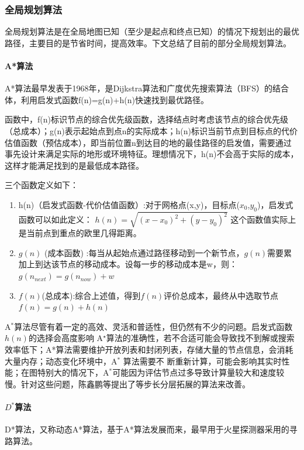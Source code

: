 \documentclass{report}
\begin{document}
\subsubsection{全局规划算法}
\label{subsec:label}
全局规划算法是在全局地图已知（至少是起点和终点已知）的情况下规划出的最优路径，主要目的是节省时间，提高效率。下文总结了目前的部分全局规划算法。
\paragraph{A*算法}
A*算法最早发表于1968年，是Dijkstra算法和广度优先搜索算法（BFS）的结合体，利用启发式函数f(n)=g(n)+h(n)快速找到最优路径。

函数中，f(n)标识节点的综合优先级函数，选择结点时考虑该节点的综合优先级（总成本）；g(n)表示起始点到点n的实际成本；h(n)标识当前节点到目标点的代价估值函数（预估成本），即当前位置n到达目的地的最佳路径的启发值，需要通过事先设计来满足实际的地形或环境特征。理想情况下，h(n)不会高于实际的成本，这样才能满足找到的是最低成本路径。

三个函数定义如下：
\begin{enumerate}
\item 	h(n)（启发式函数-代价估值函数）:对于网格点(x,y)，目标点($x_0$,$y_0$)，启发式函数可以如此定义： \( h(n)=\sqrt{(x-x_0)^2+(y-y_0)^2} \) 这个函数值实际上是当前点到重点的欧里几得距离。
\item $g(n)$ (成本函数) :每当从起始点通过路径移动到一个新节点，$g(n)$需要累加上到达该节点的移动成本。设每一步的移动成本是w，则：$g(n_{next})=g(n_{now})+w$
  \item  $f(n)$(总成本):综合上述值，得到$f(n)$评价总成本，最终从中选取节点$f(n)=g(n)+h(n)$

\end{enumerate}
A$^{*}$算法尽管有着一定的高效、灵活和普适性，但仍然有不少的问题。启发式函数$h(n)$的选择会高度影响 A$^\star$算法的准确性，若不合适可能会导致找不到解或搜索效率低下；A*算法需要维护开放列表和封闭列表，存储大量的节点信息，会消耗大量内存；动态变化环境中，A$^{*}$ 算法需要不 断重新计算，可能会影响其实时性能；在图特别大的情况下，A$^{*}$可能因为评估节点过多导致计算量较大和速度较慢。针对这些问题，陈鑫鹏等提出了等步长分层拓展的算法来改善\cite{jh3}。

\paragraph{$D^{*}$算法}

D*算法，又称动态A*算法，基于A*算法发展而来，最早用于火星探测器采用的寻路算法。
\end{document}
